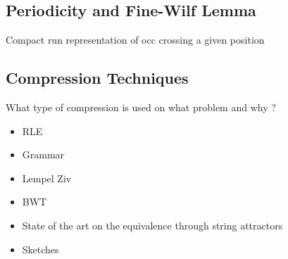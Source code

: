 \subsection{Periodicity and Fine-Wilf Lemma}\label{sec:prelim:FW}
Compact run representation of occ crossing a given position


\subsection{Compression Techniques}\label{sec:prelim:compress}
What type of compression is used on what problem and why ?
\begin{itemize}
\item RLE
\item Grammar
\item Lempel Ziv
\item BWT
\item State of the art on the equivalence through string attractors
\item Sketches
\end{itemize}